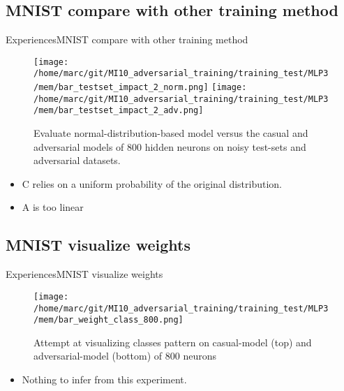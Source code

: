 \documentclass[10pt]{beamer}
\begin{document}
\subsection{MNIST compare with other training method}
\begin{frame}{Experiences}{MNIST compare with other training method}
  \pause
  \begin{figure}
    \centering
    \texttt{[image: /home/marc/git/MI10\_adversarial\_training/training\_test/MLP3/mem/bar\_testset\_impact\_2\_norm.png]} \pause
    \texttt{[image: /home/marc/git/MI10\_adversarial\_training/training\_test/MLP3/mem/bar\_testset\_impact\_2\_adv.png]}
    \caption{Evaluate normal-distribution-based model versus the casual and adversarial models of 800 hidden neurons on noisy test-sets and adversarial datasets.}
    \label{fig:mnist_noisy_learn}
  \end{figure}
  \pause
  \begin{itemize}
    \item C relies on a uniform probability of the original distribution.
    \item A is too linear
  \end{itemize}
\end{frame}

\subsection{MNIST visualize weights}
\begin{frame}{Experiences}{MNIST visualize weights}
  \pause
  \begin{figure}
    \centering
    \texttt{[image: /home/marc/git/MI10\_adversarial\_training/training\_test/MLP3/mem/bar\_weight\_class\_800.png]}
    \caption{Attempt at visualizing classes pattern on casual-model (top) and adversarial-model (bottom) of 800 neurons}
    \label{fig:mnist_weight_class}
  \end{figure}
  \pause
  \begin{itemize}
    \item Nothing to infer from this experiment.
  \end{itemize}
\end{frame}
\end{document}
